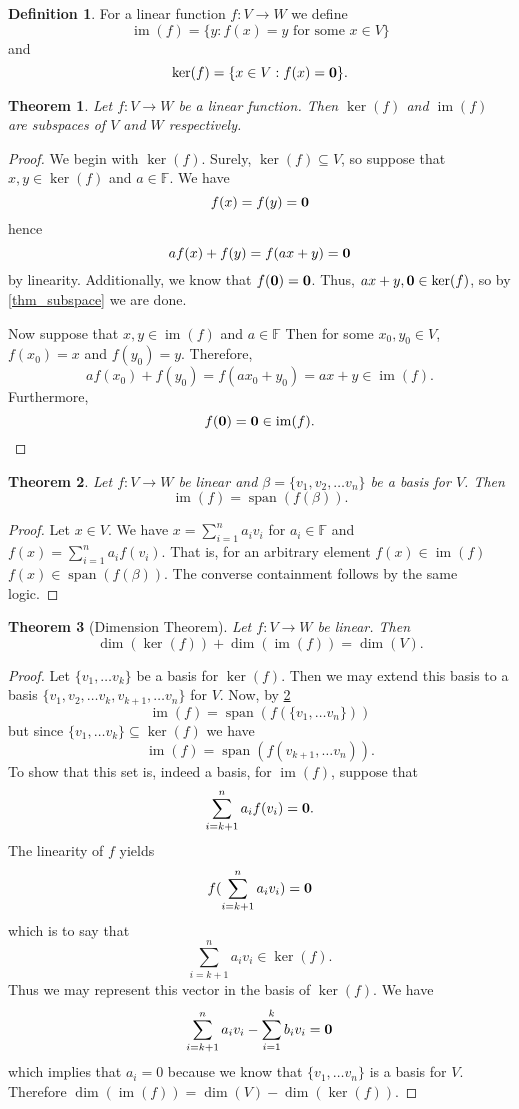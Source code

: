 \documentclass[oneside, 12pt]{book}
\DeclareMathOperator{\spn}{span}
\DeclareMathOperator{\im}{im}
\newtheorem{thm}{Theorem}[section]
\theoremstyle{definition}
\newtheorem{defn}{Definition}[section]
\begin{document}
\begin{defn}
\label{defn_kerim}
For a linear function $f: V \to W$ we define \[ \im(f)=\{y: f(x)=y \text{ for some } x\in V \} \]
and
\[\ker(f)=\{x \in V: f(x)=\bold{0} \}.\]
\end{defn}
\begin{thm}
\label{thm_kerim}
Let $f: V \to W$ be a linear function. Then $\ker(f)$ and $\im(f)$ are subspaces of $V$ and $W$ respectively.
\end{thm}
\begin{proof}
  We begin with $\ker(f)$. Surely, $\ker(f) \subseteq V$, so suppose that $x,y \in \ker(f)$ and $a \in \mathbb{F}$. We have \[f(x)=f(y)=\bold{0}\] hence \[af(x)+f(y)=f(ax+y)=\bold{0}\] by linearity. Additionally, we know that $f(\bold{0})=\bold{0}$. Thus, $ax+y, \bold{0} \in \ker(f)$, so by \ref{thm_subspace} we are done.

  Now suppose that $x,y \in \im(f)$ and $a \in \mathbb{F}$ Then for some $x_{0},y_{0} \in V$, $f(x_{0})=x$ and $f(y_{0})=y$. Therefore, \[af(x_{0})+f(y_{0})=f(ax_{0}+y_{0})=ax+y \in \im(f).\] Furthermore, \[f(\bold{0})=\bold{0}\in \im(f).\]
\end{proof}
\begin{thm}
\label{thm_linspan}
Let $f:V \to W$ be linear and $\beta=\{v_{1}, v_{2}, \dots v_{n}\}$ be a basis for $V$. Then \[\im(f)=\spn(f(\beta)).\]

\end{thm}
\begin{proof}
Let $x \in V$. We have $x=\sum\limits_{i=1}^{n}a_{i}v_{i}$ for $a_{i} \in \mathbb{F}$ and $f(x)=\sum\limits_{i=1}^{n}a_{i}f(v_{i})$. That is, for an arbitrary element $f(x) \in \im(f)$ $f(x) \in \spn(f(\beta))$. The converse containment follows by the same logic.
\end{proof}
\begin{thm}[Dimension Theorem]
\label{thm_dimens}
  Let $f: V \to W$ be linear. Then \[\dim(\ker(f)) + \dim(\im(f))=\dim(V).\]
\end{thm}
\begin{proof}
Let $\{v_{1}, \dots v_{k}\}$ be a basis for $\ker(f)$. Then we may extend this basis to a basis $\{v_{1}, v_{2}, \dots v_{k}, v_{k+1}, \dots v_{n}\}$ for $V$. Now, by \ref{thm_linspan} \[\im(f)=\spn(f(\{v_{1}, \dots v_{n}\}))\] but since $\{v_{1}, \dots v_{k}\} \subseteq \ker(f)$ we have \[\im(f)=\spn(f(v_{k+1}, \dots v_{n})).\] To show that this set is, indeed a basis, for $\im(f)$, suppose that \[\sum_{i=k+1}^{n}a_{i}f(v_{i})=\bold{0}.\] The linearity of $f$ yields \[f(\sum_{i=k+1}^{n}a_{i}v_{i})=\bold{0}\] which is to say that \[\sum_{i=k+1}^{n}a_{i}v_{i} \in \ker(f).\] Thus we may represent this vector in the basis of $\ker(f)$. We have \[\sum_{i=k+1}^{n}a_{i}v_{i}- \sum_{i=1}^{k}b_{i}v_{i}=\bold{0}\] which implies that $a_{i}=0$ because we know that $\{v_{1}, \dots v_{n}\}$ is a basis for $V$. Therefore $\dim(\im(f))=\dim(V)-\dim(\ker(f))$.
\end{proof}
\end{document}
